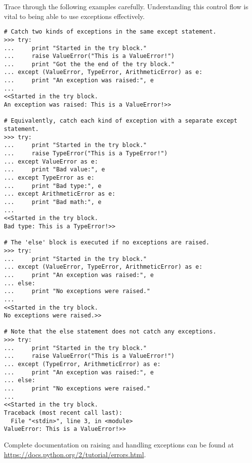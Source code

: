 Trace through the following examples carefully.
Understanding this control flow is vital to being able to use exceptions effectively.

\begin{lstlisting}
# Catch two kinds of exceptions in the same except statement.
>>> try:
...     print "Started in the try block."
...     raise ValueError("This is a ValueError!")
...     print "Got the the end of the try block."
... except (ValueError, TypeError, ArithmeticError) as e:
...     print "An exception was raised:", e
...
<<Started in the try block.
An exception was raised: This is a ValueError!>>

# Equivalently, catch each kind of exception with a separate except statement.
>>> try:
...     print "Started in the try block."
...     raise TypeError("This is a TypeError!")
... except ValueError as e:
...     print "Bad value:", e
... except TypeError as e:
...     print "Bad type:", e
... except ArithmeticError as e:
...     print "Bad math:", e
...
<<Started in the try block.
Bad type: This is a TypeError!>>

# The 'else' block is executed if no exceptions are raised.
>>> try:
...     print "Started in the try block."
... except (ValueError, TypeError, ArithmeticError) as e:
...     print "An exception was raised:", e
... else:
...     print "No exceptions were raised."
...
<<Started in the try block.
No exceptions were raised.>>

# Note that the else statement does not catch any exceptions.
>>> try:
...     print "Started in the try block."
...     raise ValueError("This is a ValueError!")
... except (TypeError, ArithmeticError) as e:
...     print "An exception was raised:", e
... else:
...     print "No exceptions were raised."
...
<<Started in the try block.
Traceback (most recent call last):
  File "<stdin>", line 3, in <module>
ValueError: This is a ValueError!>>
\end{lstlisting}

Complete documentation on raising and handling exceptions can be found at \url{https://docs.python.org/2/tutorial/errors.html}.

